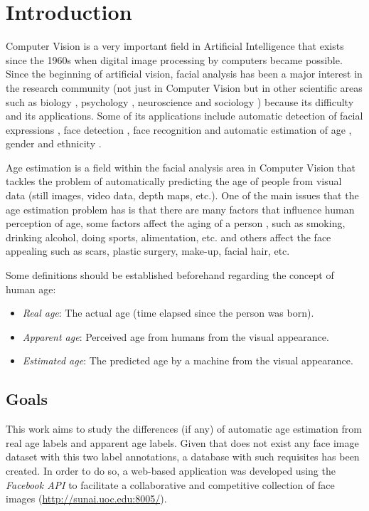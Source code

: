 \chapter{Introduction} \label{chap:introduction}

Computer Vision is a very important field in Artificial Intelligence that exists since the 1960s when digital image processing by computers became possible. Since the beginning of artificial vision, facial analysis has been a major interest in the research community (not just in Computer Vision but in other scientific areas such as biology \cite{bhl24064}, psychology \cite{ekm02}, neuroscience \cite{freiwald2009face} and sociology \cite{kemper1978social}) because its difficulty and its applications. Some of its applications include automatic detection of facial expressions \cite{cohen2003facial}, face detection \cite{hsu2002face}, face recognition \cite{wright2009robust} \cite{taigman2014deepface} and automatic estimation of age \cite{4359348}, gender \cite{alexandre2010gender} and ethnicity \cite{hosoi2004ethnicity}.

Age estimation is a field within the facial analysis area in Computer Vision that tackles the problem of automatically predicting the age of people from visual data (still images, video data, depth maps, etc.). One of the main issues that the age estimation problem has is that there are many factors that influence human perception of age, some factors affect the aging of a person \cite{shephard1997aging}, such as smoking, drinking alcohol, doing sports, alimentation, etc. and others affect the face appealing such as scars, plastic surgery, make-up, facial hair, etc.

Some definitions should be established beforehand regarding the concept of human age:
\begin{itemize}
	\item \textit{Real age}: The actual age (time elapsed since the person was born).
	\item \textit{Apparent age}: Perceived age from humans from the visual appearance. 
	\item \textit{Estimated age}: The predicted age by a machine from the visual appearance.
\end{itemize}

\section{Goals}
This work aims to study the differences (if any) of automatic age estimation from real age labels and apparent age labels. Given that does not exist any face image dataset with this two label annotations, a database with such requisites has been created. In order to do so, a web-based application was developed using the \textit{Facebook API} to facilitate a collaborative and competitive collection of face images (\url{http://sunai.uoc.edu:8005/}).

